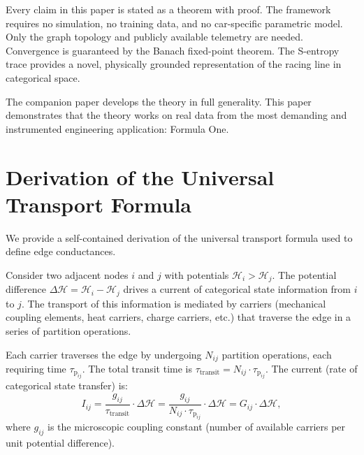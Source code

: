 \documentclass[twocolumn,10pt,a4paper]{article}
\theoremstyle{definition}
\theoremstyle{remark}
\newcommand{\Hcal}{\mathcal{H}}
\newcommand{\tauP}{\tau_{\mathrm{p}}}
\begin{document}
Every claim in this paper is stated as a theorem with proof. The framework requires no simulation, no training data, and no car-specific parametric model. Only the graph topology and publicly available telemetry are needed. Convergence is guaranteed by the Banach fixed-point theorem. The S-entropy trace provides a novel, physically grounded representation of the racing line in categorical space.

The companion paper \citep{Sachikonye2026circuitgraph} develops the theory in full generality. This paper demonstrates that the theory works on real data from the most demanding and instrumented engineering application: Formula One.



\appendix

\section{Derivation of the Universal Transport Formula}\label{app:transport}

We provide a self-contained derivation of the universal transport formula used to define edge conductances.

Consider two adjacent nodes $i$ and $j$ with potentials $\Hcal_i > \Hcal_j$. The potential difference $\Delta\Hcal = \Hcal_i - \Hcal_j$ drives a current of categorical state information from $i$ to $j$. The transport of this information is mediated by carriers (mechanical coupling elements, heat carriers, charge carriers, etc.) that traverse the edge in a series of partition operations.

Each carrier traverses the edge by undergoing $N_{ij}$ partition operations, each requiring time $\tauP_{ij}$. The total transit time is $\tau_{\mathrm{transit}} = N_{ij} \cdot \tauP_{ij}$. The current (rate of categorical state transfer) is:
\begin{equation}\label{eq:current_app}
    I_{ij} = \frac{g_{ij}}{\tau_{\mathrm{transit}}} \cdot \Delta\Hcal = \frac{g_{ij}}{N_{ij} \cdot \tauP_{ij}} \cdot \Delta\Hcal = G_{ij} \cdot \Delta\Hcal,
\end{equation}
where $g_{ij}$ is the microscopic coupling constant (number of available carriers per unit potential difference).
\end{document}
